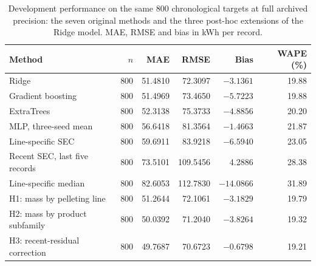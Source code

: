 \begin{table}[!htbp]\centering\small
\caption{Development performance on the same 800 chronological targets at full archived precision: the seven original methods and the three post-hoc extensions of the Ridge model. MAE, RMSE and bias in kWh per record.}\label{tab:s_development}
\begin{tabular}{@{}lrrrrr@{}}\toprule
Method & $n$ & MAE & RMSE & Bias & WAPE (\%) \\\midrule
Ridge & 800 & 51.4810 & 72.3097 & $-3.1361$ & 19.88 \\
Gradient boosting & 800 & 51.4969 & 73.4650 & $-5.7223$ & 19.88 \\
ExtraTrees & 800 & 52.3138 & 75.3733 & $-4.8856$ & 20.20 \\
MLP, three-seed mean & 800 & 56.6418 & 81.3564 & $-1.4663$ & 21.87 \\
Line-specific SEC & 800 & 59.6911 & 83.9218 & $-6.5940$ & 23.05 \\
Recent SEC, last five records & 800 & 73.5101 & 109.5456 & 4.2886 & 28.38 \\
Line-specific median & 800 & 82.6053 & 112.7830 & $-14.0866$ & 31.89 \\
H1: mass by pelleting line & 800 & 51.2644 & 72.1061 & $-3.1829$ & 19.79 \\
H2: mass by product subfamily & 800 & 50.0392 & 71.2040 & $-3.8264$ & 19.32 \\
H3: recent-residual correction & 800 & 49.7687 & 70.6723 & $-0.6798$ & 19.21 \\
\bottomrule
\end{tabular}
\end{table}
